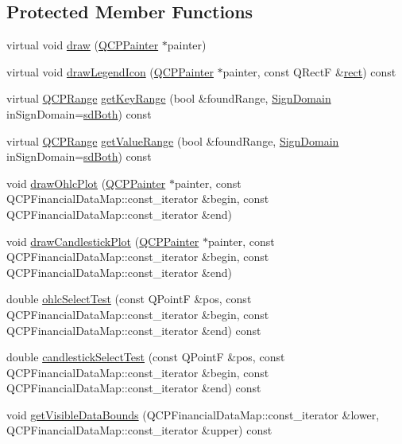 \subsection*{Protected Member Functions}
\begin{DoxyCompactItemize}
\item 
virtual void \hyperlink{class_q_c_p_financial_ad71a59a1b42616594831e04e52c92120}{draw} (\hyperlink{class_q_c_p_painter}{Q\+C\+P\+Painter} $\ast$painter)
\item 
virtual void \hyperlink{class_q_c_p_financial_aca85e8435b092cc8c3e5de65fcfb22c8}{draw\+Legend\+Icon} (\hyperlink{class_q_c_p_painter}{Q\+C\+P\+Painter} $\ast$painter, const Q\+Rect\+F \&\hyperlink{_gen_blob_8m_aea8f6815d9a63491fc422c5572c6b3c3}{rect}) const 
\item 
virtual \hyperlink{class_q_c_p_range}{Q\+C\+P\+Range} \hyperlink{class_q_c_p_financial_acc747f4a9b4fddfb14eb9d803349a534}{get\+Key\+Range} (bool \&found\+Range, \hyperlink{class_q_c_p_abstract_plottable_a661743478a1d3c09d28ec2711d7653d8}{Sign\+Domain} in\+Sign\+Domain=\hyperlink{class_q_c_p_abstract_plottable_a661743478a1d3c09d28ec2711d7653d8a082b98cfb91a7363a3b5cd17b0c1cd60}{sd\+Both}) const 
\item 
virtual \hyperlink{class_q_c_p_range}{Q\+C\+P\+Range} \hyperlink{class_q_c_p_financial_ab2b5f3ef9a503ba32ead32081333f4e7}{get\+Value\+Range} (bool \&found\+Range, \hyperlink{class_q_c_p_abstract_plottable_a661743478a1d3c09d28ec2711d7653d8}{Sign\+Domain} in\+Sign\+Domain=\hyperlink{class_q_c_p_abstract_plottable_a661743478a1d3c09d28ec2711d7653d8a082b98cfb91a7363a3b5cd17b0c1cd60}{sd\+Both}) const 
\item 
void \hyperlink{class_q_c_p_financial_a3c3007a7434e29d042c77ccf4f497e66}{draw\+Ohlc\+Plot} (\hyperlink{class_q_c_p_painter}{Q\+C\+P\+Painter} $\ast$painter, const Q\+C\+P\+Financial\+Data\+Map\+::const\+\_\+iterator \&begin, const Q\+C\+P\+Financial\+Data\+Map\+::const\+\_\+iterator \&end)
\item 
void \hyperlink{class_q_c_p_financial_a71f5081da0e5ab9c40a488ad40cff122}{draw\+Candlestick\+Plot} (\hyperlink{class_q_c_p_painter}{Q\+C\+P\+Painter} $\ast$painter, const Q\+C\+P\+Financial\+Data\+Map\+::const\+\_\+iterator \&begin, const Q\+C\+P\+Financial\+Data\+Map\+::const\+\_\+iterator \&end)
\item 
double \hyperlink{class_q_c_p_financial_a9c7d79351e728a67bfb6821c1d1bd6c0}{ohlc\+Select\+Test} (const Q\+Point\+F \&pos, const Q\+C\+P\+Financial\+Data\+Map\+::const\+\_\+iterator \&begin, const Q\+C\+P\+Financial\+Data\+Map\+::const\+\_\+iterator \&end) const 
\item 
double \hyperlink{class_q_c_p_financial_abd0137244a17d5486a01ee442b083333}{candlestick\+Select\+Test} (const Q\+Point\+F \&pos, const Q\+C\+P\+Financial\+Data\+Map\+::const\+\_\+iterator \&begin, const Q\+C\+P\+Financial\+Data\+Map\+::const\+\_\+iterator \&end) const 
\item 
void \hyperlink{class_q_c_p_financial_aca2edf9f19fae733cdb6bd4549019b84}{get\+Visible\+Data\+Bounds} (Q\+C\+P\+Financial\+Data\+Map\+::const\+\_\+iterator \&lower, Q\+C\+P\+Financial\+Data\+Map\+::const\+\_\+iterator \&upper) const 
\end{DoxyCompactItemize}
